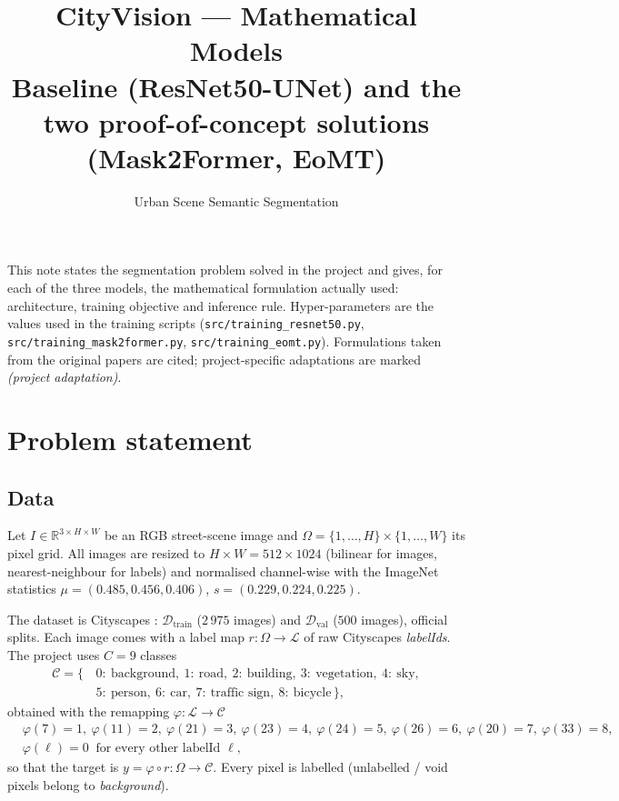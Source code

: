 \documentclass[11pt,a4paper]{article}
\title{\textbf{CityVision --- Mathematical Models}\\[2pt]
\large Baseline (ResNet50-UNet) and the two proof-of-concept solutions\\
(Mask2Former, EoMT)}
\author{Urban Scene Semantic Segmentation}
\date{}
\newcommand{\R}{\mathbb{R}}
\newcommand{\1}{\mathbb{1}}
\begin{document}
\maketitle

\noindent\sloppy
This note states the segmentation problem solved in the project and gives,
for each of the three models, the mathematical formulation actually used:
architecture, training objective and inference rule. Hyper-parameters are the
values used in the training scripts (\texttt{src/training\_resnet50.py},
\texttt{src/training\_mask2former.py}, \texttt{src/training\_eomt.py}).
Formulations taken from the original papers are cited; project-specific
adaptations are marked \emph{(project adaptation)}.

\tableofcontents

\section{Problem statement}

\subsection{Data}

Let $I \in \R^{3\times H\times W}$ be an RGB street-scene image and
$\Omega = \{1,\dots,H\}\times\{1,\dots,W\}$ its pixel grid. All images are
resized to $H\times W = 512\times1024$ (bilinear for images, nearest-neighbour
for labels) and normalised channel-wise with the ImageNet statistics
$\mu = (0.485, 0.456, 0.406)$, $s = (0.229, 0.224, 0.225)$.

The dataset is Cityscapes \cite{cordts2016}:
$\mathcal{D}_{\text{train}}$ ($2\,975$ images) and
$\mathcal{D}_{\text{val}}$ ($500$ images), official splits. Each image comes
with a label map $r : \Omega \to \mathcal{L}$ of raw Cityscapes
\emph{labelIds}. The project uses $C = 9$ classes
\[
\begin{aligned}
\mathcal{C} = \{\,&0{:}\ \text{background},\ 1{:}\ \text{road},\ 2{:}\ \text{building},\
3{:}\ \text{vegetation},\ 4{:}\ \text{sky},\\
&5{:}\ \text{person},\ 6{:}\ \text{car},\ 7{:}\ \text{traffic sign},\ 8{:}\ \text{bicycle}\,\},
\end{aligned}
\]
obtained with the remapping $\varphi : \mathcal{L}\to\mathcal{C}$
\[
\begin{aligned}
&\varphi(7)=1,\ \varphi(11)=2,\ \varphi(21)=3,\ \varphi(23)=4,\ \varphi(24)=5,\
\varphi(26)=6,\ \varphi(20)=7,\ \varphi(33)=8,\\
&\varphi(\ell)=0 \ \text{ for every other labelId } \ell,
\end{aligned}
\]
so that the target is $y = \varphi\circ r : \Omega\to\mathcal{C}$. Every
pixel is labelled (unlabelled / void pixels belong to \emph{background}).
\end{document}
